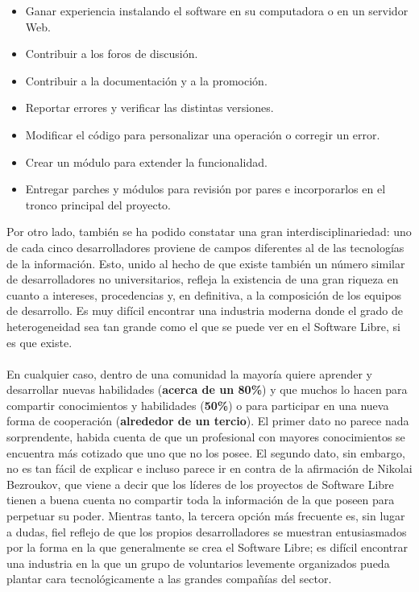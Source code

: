 \begin{itemize}
     \item Ganar experiencia instalando el software en su computadora o en un servidor Web. 
     \item Contribuir a los foros de discusión.
     \item Contribuir a la documentación y a la promoción.
     \item Reportar errores y verificar las distintas versiones.
     \item Modificar el código para personalizar una operación o corregir un error.
     \item Crear un módulo para extender la funcionalidad.
     \item Entregar parches y módulos para revisión por pares e incorporarlos en el tronco principal del proyecto.
\end{itemize}
Por otro lado, también se ha podido constatar una gran interdisciplinariedad: uno de cada cinco desarrolladores proviene de campos diferentes al de las tecnologías de la información. Esto, unido al hecho de que existe también un número similar de desarrolladores no universitarios, refleja la existencia de una gran riqueza en cuanto a intereses, procedencias y, en definitiva, a la composición de los equipos de desarrollo. Es muy difícil encontrar una industria moderna donde el grado de heterogeneidad sea tan grande como el que se puede ver en el Software Libre, si es que existe.
\\
\\
En cualquier caso, dentro de una comunidad la mayoría quiere aprender y desarrollar nuevas habilidades ({\bf acerca de un 80\%}) y que muchos lo hacen para compartir conocimientos y habilidades ({\bf 50\%}) o para participar en una nueva forma de cooperación ({\bf alrededor de un tercio}). El primer dato no parece nada sorprendente, habida cuenta de que un profesional con mayores conocimientos se encuentra más cotizado que uno que no los posee. El segundo dato, sin embargo, no es tan fácil de explicar e incluso parece ir en contra de la afirmación de Nikolai Bezroukov, que viene a decir que los líderes de los proyectos de Software Libre tienen a buena cuenta no compartir toda la información de la que poseen para perpetuar su poder. Mientras tanto, la tercera opción más frecuente es, sin lugar a dudas, fiel reflejo de que los propios desarrolladores se muestran entusiasmados por la forma en la que generalmente se crea el Software Libre; es difícil encontrar una industria en la que un grupo de voluntarios levemente organizados pueda plantar cara tecnológicamente a las grandes compañías del sector.
